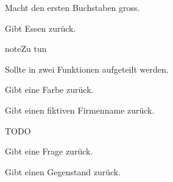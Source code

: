 \documentclass[a4paper,12pt,oneside]{sphinxmanual}
\begin{document}

\begin{fulllineitems}
\label{funktionen:pyzufall.ersten_buchstaben_gross}
Macht den ersten Buchstaben gross.

\end{fulllineitems}


\begin{fulllineitems}
\label{funktionen:pyzufall.essen}
Gibt Essen zurück.

\begin{notice}{note}{Zu tun}

Sollte in zwei Funktionen aufgeteilt werden.
\end{notice}

\end{fulllineitems}


\begin{fulllineitems}
\label{funktionen:pyzufall.farbe}
Gibt eine Farbe zurück.

\end{fulllineitems}


\begin{fulllineitems}
\label{funktionen:pyzufall.firma}
Gibt einen fiktiven Firmenname zurück.

TODO

\end{fulllineitems}


\begin{fulllineitems}
\label{funktionen:pyzufall.frage}
Gibt eine Frage zurück.

\end{fulllineitems}


\begin{fulllineitems}
\label{funktionen:pyzufall.gegenstand}
Gibt einen Gegenstand zurück.

\end{fulllineitems}
\end{document}
